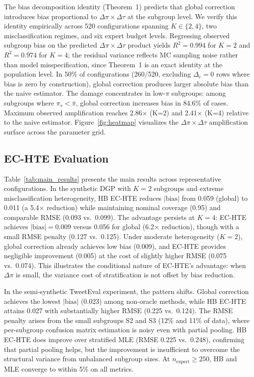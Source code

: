 The bias decomposition identity (Theorem~1) predicts that global correction introduces bias proportional to $\Delta\pi \times \Delta\tau$ at the subgroup level.
We verify this identity empirically across 520 configurations spanning $K \in \{2,4\}$, two misclassification regimes, and six expert budget levels.
Regressing observed subgroup bias on the predicted $\Delta\pi \times \Delta\tau$ product yields $R^2 = 0.994$ for $K{=}2$ and $R^2 = 0.974$ for $K{=}4$; the residual variance reflects MC sampling noise rather than model misspecification, since Theorem~1 is an exact identity at the population level.
In 50\% of configurations (260/520, excluding $\Delta_c{=}0$ rows where bias is zero by construction), global correction produces larger absolute bias than the naive estimator.
The damage concentrates in low-$\pi$ subgroups: among subgroups where $\pi_s < \bar{\pi}$, global correction increases bias in 84.6\% of cases.
Maximum observed amplification reaches 2.86$\times$ (K=2) and 2.41$\times$ (K=4) relative to the naive estimator.
Figure~\ref{fig:heatmap} visualizes the $\Delta\pi \times \Delta\tau$ amplification surface across the parameter grid.

\subsection{EC-HTE Evaluation}
\label{sec:ec_hte_eval}

Table~\ref{tab:main_results} presents the main results across representative configurations.
In the synthetic DGP with $K{=}2$ subgroups and extreme misclassification heterogeneity, HB EC-HTE reduces $|\text{bias}|$ from 0.059 (global) to 0.011 (a 5.4$\times$ reduction) while maintaining nominal coverage (0.95) and comparable RMSE (0.093 vs.\ 0.099).
The advantage persists at $K{=}4$: EC-HTE achieves $|\text{bias}|{=}0.009$ versus 0.056 for global (6.2$\times$ reduction), though with a small RMSE penalty (0.127 vs.\ 0.125).
Under moderate heterogeneity ($K{=}2$), global correction already achieves low bias (0.009), and EC-HTE provides negligible improvement (0.005) at the cost of slightly higher RMSE (0.075 vs.\ 0.074).
This illustrates the conditional nature of EC-HTE's advantage: when $\Delta\pi$ is small, the variance cost of stratification is not offset by bias reduction.

In the semi-synthetic TweetEval experiment, the pattern shifts.
Global correction achieves the lowest $|\text{bias}|$ (0.023) among non-oracle methods, while HB EC-HTE attains 0.027 with substantially higher RMSE (0.225 vs.\ 0.124).
The RMSE penalty arises from the small subgroups S2 and S3 (12\% and 11\% of data), where per-subgroup confusion matrix estimation is noisy even with partial pooling.
HB EC-HTE does improve over stratified MLE (RMSE 0.225 vs.\ 0.248), confirming that partial pooling helps, but the improvement is insufficient to overcome the structural variance from unbalanced subgroup sizes.
At $n_{\text{expert}} \geq 250$, HB and MLE converge to within 5\% on all metrics.

